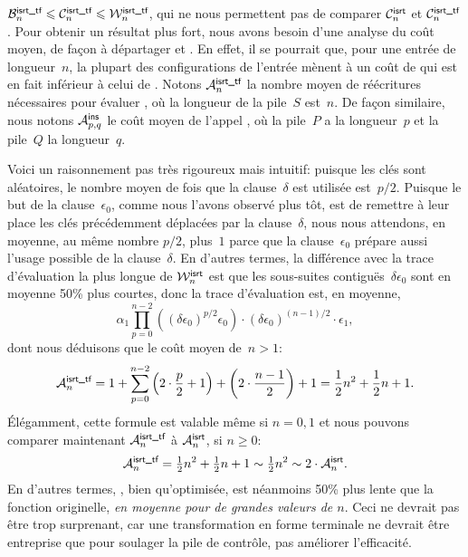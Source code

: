 \(\B{\smash[t]{\fun{isrt\_tf}}}{n} \leqslant
\C{\smash[t]{\fun{isrt\_tf}}}{n} \leqslant
\W{\smash[t]{\fun{isrt\_tf}}}{n}\), qui ne nous permettent pas de
comparer \(\C{\fun{isrt}}{n}\) et
\(\C{\smash[t]{\fun{isrt\_tf}}}{n}\). Pour obtenir un résultat plus
fort, nous avons besoin d'une analyse du coût moyen, de façon à
départager  et . En effet, il se
pourrait que, pour une entrée de longueur~\(n\), la plupart des
configurations de l'entrée mènent à un coût de 
qui est en fait inférieur à celui de . Notons
\(\M{\smash[t]{\fun{isrt\_tf}}}{n}\) la nombre moyen de réécritures
nécessaires pour évaluer , où la longueur
de la pile~\(S\) est~\(n\). De façon similaire, nous notons
\(\M{\fun{ins}}{p,q}\) le coût moyen de l'appel
, où la pile~\(P\) a la longueur~\(p\)
et la pile~\(Q\) la longueur~\(q\).

Voici un raisonnement pas très rigoureux mais intuitif: puisque les
clés sont aléatoires, le nombre moyen de fois que la clause~\(\delta\)
est utilisée est~\(p/2\). Puisque le but de la clause~\(\epsilon_0\),
comme nous l'avons observé plus tôt, est de remettre à leur place les
clés précédemment déplacées par la clause~\(\delta\), nous nous
attendons, en moyenne, au même nombre \(p/2\), plus~\(1\) parce que la
clause~\(\epsilon_0\) prépare aussi l'usage possible de la
clause~\(\delta\). En d'autres termes, la différence avec la trace
d'évaluation la plus longue de \(\W{\fun{isrt}}{n}\) est que les
sous-suites contiguës~\(\delta\epsilon_0\) sont en moyenne 50\% plus
courtes, donc la trace d'évaluation est, en moyenne,
\begin{equation*}
\alpha_1\prod_{p=0}^{n-2}{\left((\delta\epsilon_0)^{p/2}\epsilon_0\right)}
\cdot (\delta\epsilon_0)^{(n-1)/2} \cdot \epsilon_1,
\end{equation*}
dont nous déduisons que le coût moyen de~\(n>1\):
\begin{equation*}
  \M{\fun{isrt\_tf}}{n} = 1 +
  \sum_{p=0}^{n-2}{\left(2\cdot\frac{p}{2}+1\right)}
                       + \left(2\cdot\frac{n-1}{2}\right) + 1
                     = \frac{1}{2}{n^2} + \frac{1}{2}{n} + 1.
\end{equation*}
Élégamment, cette formule est valable même si \(n=0,1\) et nous
pouvons comparer maintenant \(\M{\fun{isrt\_tf}}{n}\) à
\(\M{\fun{isrt}}{n}\), si \(n\geqslant{}0\):
\begin{equation*}
\M{\fun{isrt\_tf}}{n}
  = \tfrac{1}{2}{n^2} + \tfrac{1}{2}{n} + 1
  \sim \tfrac{1}{2}{n^2} \sim 2 \cdot \M{\fun{isrt}}{n}.
\end{equation*}
En d'autres termes, , bien qu'optimisée, est
néanmoins 50\% plus lente que la fonction originelle, \emph{en
  moyenne pour de grandes valeurs de \(n\)}. Ceci ne devrait pas être
trop surprenant, car une transformation en forme terminale ne devrait
être entreprise que pour soulager la pile de contrôle, pas améliorer
l'efficacité.

